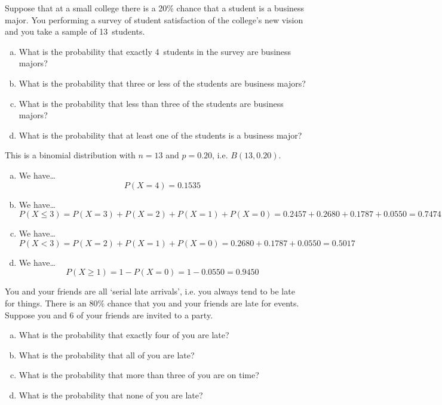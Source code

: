 \documentclass[11pt,letterpaper]{article}
\begin{document}

 Suppose that at a small college there is a 20\% chance that a student is a business major. You performing a survey of student satisfaction of the college's new vision and you take a sample of 13~students.
	\begin{enumerate}[(a)]
	\item What is the probability that exactly 4~students in the survey are business majors?
	\item What is the probability that three or less of the students are business majors?
	\item What is the probability that less than three of the students are business majors?
	\item What is the probability that at least one of the students is a business major?
	\end{enumerate} \pspace

\sol This is a binomial distribution with $n= 13$ and $p= 0.20$, i.e. $B(13, 0.20)$. 

\begin{enumerate}[(a)]
\item We have\dots
	\[
	P(X= 4)= 0.1535
	\] 

\item We have\dots
	\[
	P(X \leq 3)= P(X= 3) + P(X= 2) + P(X= 1) + P(X= 0)= 0.2457 + 0.2680 + 0.1787 + 0.0550= 0.7474 
	\]

\item We have\dots
	\[
	P(X < 3)= P(X= 2) + P(X= 1) + P(X= 0)= 0.2680 + 0.1787 + 0.0550= 0.5017 
	\] 

\item We have\dots
	\[
	P(X \geq 1)= 1 - P(X= 0)= 1 - 0.0550= 0.9450
	\]
\end{enumerate}



\newpage



 You and your friends are all `serial late arrivals', i.e. you always tend to be late for things. There is an 80\% chance that you and your friends are late for events. Suppose you and 6 of your friends are invited to a party.
	\begin{enumerate}[(a)]
	\item What is the probability that exactly four of you are late?
	\item What is the probability that all of you are late?
	\item What is the probability that more than three of you are on time?
	\item What is the probability that none of you are late?
	\end{enumerate} \pspace
\end{document}

